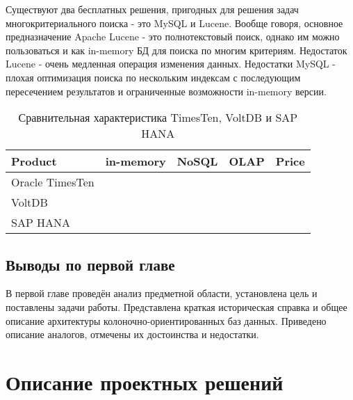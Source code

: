 \documentclass{matmex-diploma}
\begin{document}
    Существуют два бесплатных решения, пригодных для решения задач многокритериального поиска - это MySQL и Lucene. Вообще говоря, основное предназначение Apache Lucene - это полнотекстовый поиск, однако им можно пользоваться и как in-memory БД для поиска по многим критериям. Недостаток Lucene - очень медленная операция изменения данных. Недостатки MySQL - плохая оптимизация поиска по нескольким индексам с последующим пересечением результатов и ограниченные возможности in-memory версии. 
    
    \begin{table}[h]
        \centering
        \caption{Сравнительная характеристика TimesTen, VoltDB и SAP HANA}
        \begin{tabular}{| l | c | c | c | c |}
            \hline
            Product & in-memory & NoSQL & OLAP & Price \\
            \hline
            Oracle TimesTen & \color{green}{\checkmark} & \color{green}{\checkmark} & \color{green}{\checkmark} & \color{red}{€19,969.00} \\
            \hline 
            VoltDB          & \color{green}{\checkmark} & \color{green}{\checkmark} & \color{green}{\checkmark} & \color{red}{\$3500/month} \\
            \hline
            SAP HANA        & \color{green}{\checkmark} & \color{green}{\checkmark} & \color{green}{\checkmark} & \color{red}{\$3595/month}\\
            \hline
        \end{tabular}
    \end{table}
    
    \subsection{Выводы по первой главе}
        В первой главе проведён анализ предметной области, установлена цель и поставлены задачи работы. Представлена краткая историческая справка и общее описание архитектуры колоночно-ориентированных баз данных. Приведено описание аналогов, отмечены их достоинства и недостатки.
    
\section{Описание проектных решений}
\end{document}
